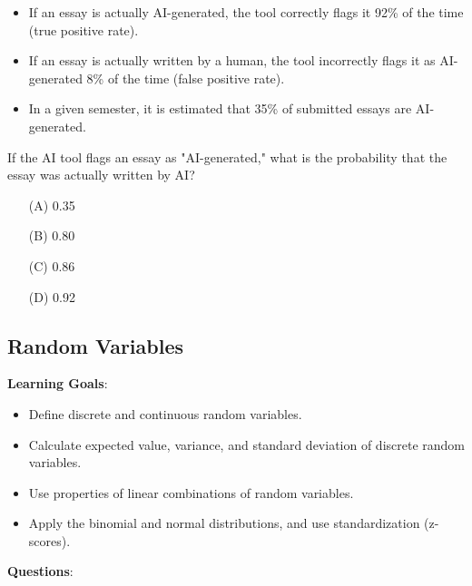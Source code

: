 \documentclass{article}
\begin{document}
\begin{enumerate}
    \begin{itemize}
        \item If an essay is actually AI-generated, the tool correctly flags it 92\% of the time (true positive rate).
        \item If an essay is actually written by a human, the tool incorrectly flags it as AI-generated 8\% of the time (false positive rate).
        \item In a given semester, it is estimated that 35\% of submitted essays are AI-generated.
    \end{itemize}
    If the AI tool flags an essay as "AI-generated," what is the probability that the essay was actually written by AI?
    \begin{enumerate}
        \item[(A)] 0.35
        \item[(B)] 0.80
        \item[(C)] 0.86
        \item[(D)] 0.92
    \end{enumerate}
\end{enumerate}


\subsection{Random Variables}
\textbf{Learning Goals}:
\begin{itemize}
    \item Define discrete and continuous random variables.
    \item Calculate expected value, variance, and standard deviation of discrete random variables.
    \item Use properties of linear combinations of random variables.
    \item Apply the binomial and normal distributions, and use standardization (z-scores).
\end{itemize}

\textbf{Questions}:
\end{document}
